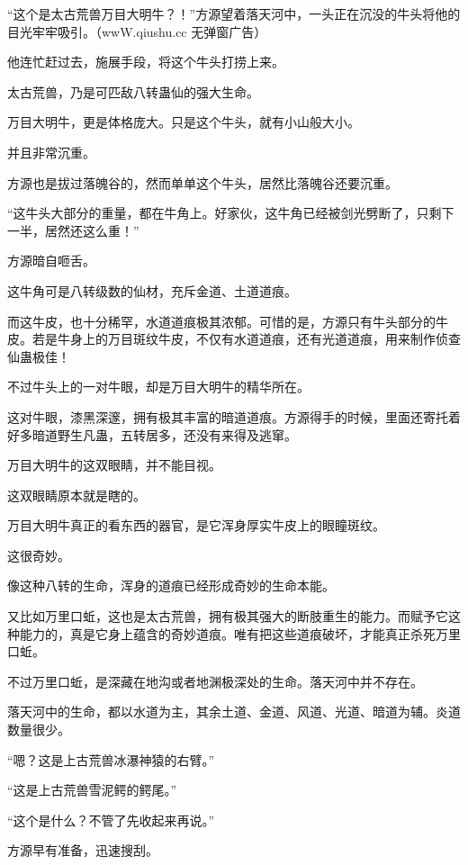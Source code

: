
\begin{this_body}

“这个是太古荒兽万目大明牛？！”方源望着落天河中，一头正在沉没的牛头将他的目光牢牢吸引。（wwW.qiushu.cc 无弹窗广告）

他连忙赶过去，施展手段，将这个牛头打捞上来。

太古荒兽，乃是可匹敌八转蛊仙的强大生命。

万目大明牛，更是体格庞大。只是这个牛头，就有小山般大小。

并且非常沉重。

方源也是拔过落魄谷的，然而单单这个牛头，居然比落魄谷还要沉重。

“这牛头大部分的重量，都在牛角上。好家伙，这牛角已经被剑光劈断了，只剩下一半，居然还这么重！”

方源暗自咂舌。

这牛角可是八转级数的仙材，充斥金道、土道道痕。

而这牛皮，也十分稀罕，水道道痕极其浓郁。可惜的是，方源只有牛头部分的牛皮。若是牛身上的万目斑纹牛皮，不仅有水道道痕，还有光道道痕，用来制作侦查仙蛊极佳！

不过牛头上的一对牛眼，却是万目大明牛的精华所在。

这对牛眼，漆黑深邃，拥有极其丰富的暗道道痕。方源得手的时候，里面还寄托着好多暗道野生凡蛊，五转居多，还没有来得及逃窜。

万目大明牛的这双眼睛，并不能目视。

这双眼睛原本就是瞎的。

万目大明牛真正的看东西的器官，是它浑身厚实牛皮上的眼瞳斑纹。

这很奇妙。

像这种八转的生命，浑身的道痕已经形成奇妙的生命本能。

又比如万里口蚯，这也是太古荒兽，拥有极其强大的断肢重生的能力。而赋予它这种能力的，真是它身上蕴含的奇妙道痕。唯有把这些道痕破坏，才能真正杀死万里口蚯。

不过万里口蚯，是深藏在地沟或者地渊极深处的生命。落天河中并不存在。

落天河中的生命，都以水道为主，其余土道、金道、风道、光道、暗道为辅。炎道数量很少。

“嗯？这是上古荒兽冰瀑神猿的右臂。”

“这是上古荒兽雪泥鳄的鳄尾。”

“这个是什么？不管了先收起来再说。”

方源早有准备，迅速搜刮。


\end{this_body}
